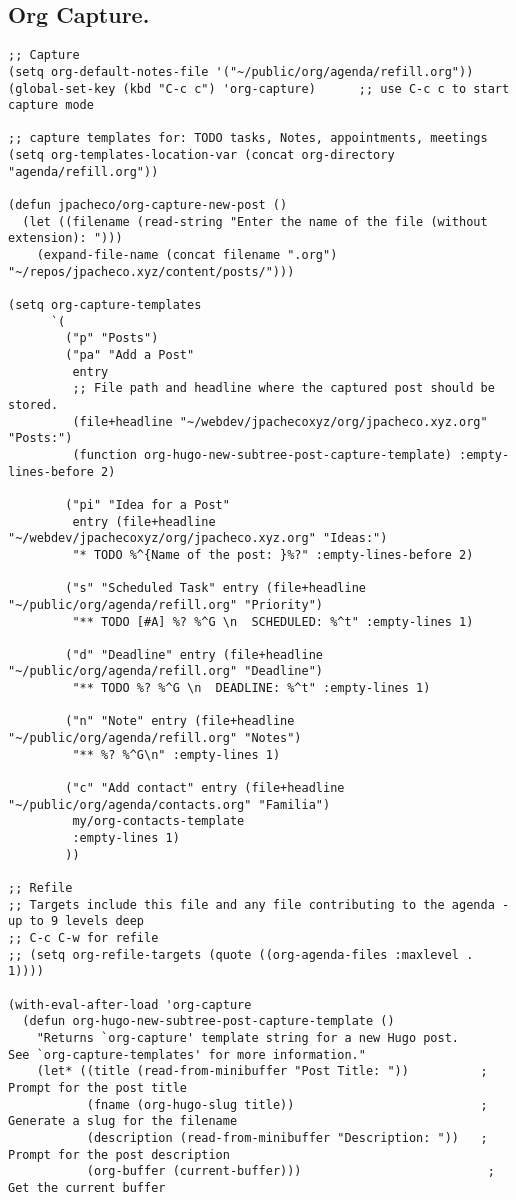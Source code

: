 \documentclass[11pt]{article}
\begin{document}
\subsection{Org Capture.}
\label{sec:orgd0084f7}
\begin{verbatim}
;; Capture
(setq org-default-notes-file '("~/public/org/agenda/refill.org"))
(global-set-key (kbd "C-c c") 'org-capture)      ;; use C-c c to start capture mode

;; capture templates for: TODO tasks, Notes, appointments, meetings
(setq org-templates-location-var (concat org-directory "agenda/refill.org"))

(defun jpacheco/org-capture-new-post ()
  (let ((filename (read-string "Enter the name of the file (without extension): ")))
    (expand-file-name (concat filename ".org") "~/repos/jpacheco.xyz/content/posts/")))

(setq org-capture-templates
      `(
        ("p" "Posts")
        ("pa" "Add a Post"
         entry
         ;; File path and headline where the captured post should be stored.
         (file+headline "~/webdev/jpachecoxyz/org/jpacheco.xyz.org" "Posts:")
         (function org-hugo-new-subtree-post-capture-template) :empty-lines-before 2)

        ("pi" "Idea for a Post"
         entry (file+headline "~/webdev/jpachecoxyz/org/jpacheco.xyz.org" "Ideas:")
         "* TODO %^{Name of the post: }%?" :empty-lines-before 2)

        ("s" "Scheduled Task" entry (file+headline "~/public/org/agenda/refill.org" "Priority")
         "** TODO [#A] %? %^G \n  SCHEDULED: %^t" :empty-lines 1)

        ("d" "Deadline" entry (file+headline "~/public/org/agenda/refill.org" "Deadline")
         "** TODO %? %^G \n  DEADLINE: %^t" :empty-lines 1)

        ("n" "Note" entry (file+headline "~/public/org/agenda/refill.org" "Notes")
         "** %? %^G\n" :empty-lines 1)

        ("c" "Add contact" entry (file+headline "~/public/org/agenda/contacts.org" "Familia")
         my/org-contacts-template
         :empty-lines 1)
        ))

;; Refile
;; Targets include this file and any file contributing to the agenda - up to 9 levels deep
;; C-c C-w for refile
;; (setq org-refile-targets (quote ((org-agenda-files :maxlevel . 1))))

(with-eval-after-load 'org-capture
  (defun org-hugo-new-subtree-post-capture-template ()
    "Returns `org-capture' template string for a new Hugo post.
See `org-capture-templates' for more information."
    (let* ((title (read-from-minibuffer "Post Title: "))          ; Prompt for the post title
           (fname (org-hugo-slug title))                          ; Generate a slug for the filename
           (description (read-from-minibuffer "Description: "))   ; Prompt for the post description
           (org-buffer (current-buffer)))                          ; Get the current buffer


\end{verbatim}
\end{document}
